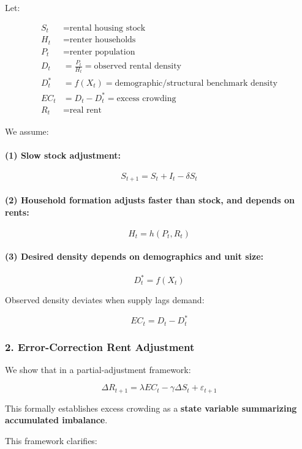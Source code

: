 \documentclass[12pt]{article}
\begin{document}
Let:

\begin{align*}
S_t &= \text{rental housing stock} \\
H_t &= \text{renter households} \\
P_t &= \text{renter population} \\
D_t &= \frac{P_t}{H_t} = \text{observed rental density} \\
D^*_t &= f(X_t) = \text{demographic/structural benchmark density} \\
EC_t &= D_t - D^*_t = \text{excess crowding} \\
R_t &= \text{real rent}
\end{align*}

We assume:

\paragraph{(1) Slow stock adjustment:}

\[
S_{t+1} = S_t + I_t - \delta S_t
\]

\paragraph{(2) Household formation adjusts faster than stock, and depends on rents:}

\[
H_t = h(P_t, R_t)
\]

\paragraph{(3) Desired density depends on demographics and unit size:}

\[
D^*_t = f(X_t)
\]

Observed density deviates when supply lags demand:

\[
EC_t = D_t - D^*_t
\]

\subsubsection*{2. Error-Correction Rent Adjustment}

We show that in a partial-adjustment framework:

\[
\Delta R_{t+1} = \lambda EC_t - \gamma \Delta S_t + \varepsilon_{t+1}
\]

This formally establishes excess crowding as a \textbf{state variable summarizing accumulated imbalance}.

This framework clarifies:
\end{document}
